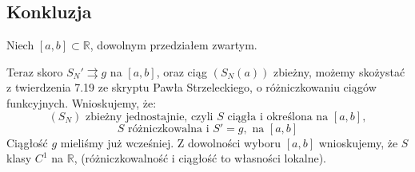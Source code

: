\documentclass{article}
\begin{document}
\subsection*{Konkluzja}

Niech $[a,b] \subset \mathbb{R}$, dowolnym przedziałem zwartym. \newline

Teraz skoro $S_N' \rightrightarrows g$ na $[a,b]$, oraz ciąg $(S_N(a))$ zbieżny, możemy skożystać z twierdzenia 7.19 ze skryptu Pawła Strzeleckiego, o różniczkowaniu ciągów funkcyjnych. \newline 
Wnioskujemy, że: 
$$(S_N) \mbox{ zbieżny jednostajnie, czyli } S \mbox{ ciągła i określona na } [a,b],$$
$$ S \mbox{ różniczkowalna i } S' = g, \mbox{ na } [a,b]$$
Ciągłość $g$ mieliśmy już wcześniej. \newline
Z dowolności wyboru $[a,b]$ wnioskujemy, że $S$ klasy $C^1$ na $\mathbb{R}$, (różniczkowalność i ciągłość to własności lokalne).
\end{document}
